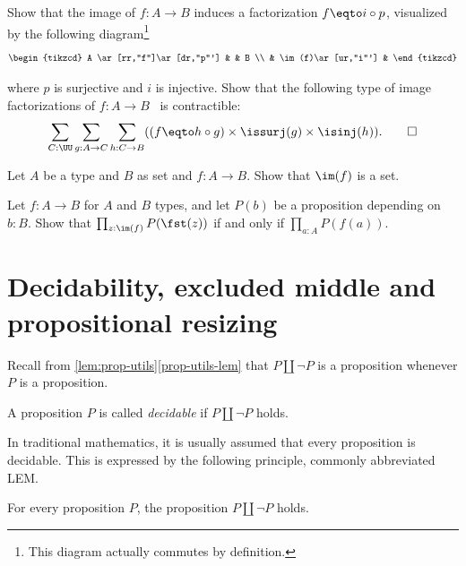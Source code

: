 \begin{xca}\label{xca:unique-fact-image}
  Show that the image of $f : A \to B$ induces a factorization
  $f \eqto i\circ p$, visualized by the following diagram\footnote{%
  This diagram actually commutes by definition.}
  \[
    \begin{tikzcd}
      A \ar[rr,"f"]\ar[dr,"p"'] & & B \\
      & \im(f)\ar[ur,"i"'] &
    \end{tikzcd}
  \]

  where $p$ is surjective and $i$ is injective. Show that the
  following type of image factorizations of $f : A \to B$~
  is contractible:
  \[
  \sum_{C:\UU}\sum_{g:A\to C}\sum_{h: C\to B}
  ((f \eqto h\circ g) \times \issurj(g) \times \isinj(h)).\qedhere
  \]
\end{xca}

\begin{xca}\label{xca:prop-image-is-set}
Let $A$ be a type and $B$ as set and $f:A\to B$.
Show that $\im(f)$ is a set.
\end{xca}

\begin{xca}\label{xca:all-prop-image}
Let $f:A\to B$ for $A$ and $B$ types, and let $P(b)$ be a proposition
depending on $b:B$.
Show that $\prod_{z:\im(f)} P(\fst(z))$ if and only if $\prod_{a:A} P(f(a))$.
\end{xca}



\section{Decidability, excluded middle and propositional resizing}
\label{sec:decidability}

Recall from \cref{lem:prop-utils}\ref{prop-utils-lem} that $P\amalg \neg P$ is a proposition whenever $P$ is a proposition.
\begin{definition}\label{def:decidability}
  A proposition $P$ is called \emph{decidable}
  if $P\amalg\neg P$ holds.
\end{definition}
In traditional mathematics, it is usually assumed that
every proposition is decidable.
This is expressed by the following principle, commonly abbreviated LEM.
\begin{principle}
  \label{pri:lem}%
  For every proposition $P$, the proposition $P \amalg \neg P$ holds.
\end{principle}

